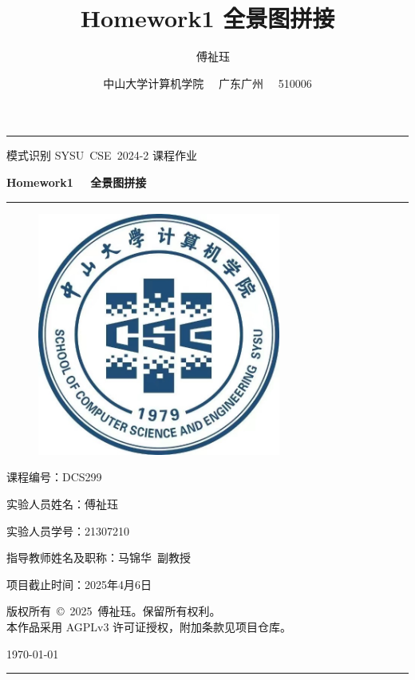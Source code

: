 \documentclass[a4paper, utf8]{ctexart}
\title{\songti \Large \textbf{Homework1 \quad 全景图拼接}}
\author{\fangsong 21307210 \ \  傅祉珏}
\date{\fangsong 中山大学计算机学院 \ \  广东广州 \ \  510006}
\renewcommand*{\songti}{\CJKfamily{zhsong}}
\begin{document}
	\begin{titlepage}
		\centering
		\rule{\textwidth}{1pt}
		\vspace{0.02\textheight}
		
		{\LARGE \kaishu 模式识别 \quad SYSU\ CSE\ 2024-2 \quad 课程作业}
		
		\vspace{0.02\textheight}
		
		{\Huge \songti \bfseries Homework1 \ \  全景图拼接}
		
		\vspace{0.025\textheight}
		\rule{0.83\textwidth}{0.4pt}
		\vspace{0.025\textheight}
		\begin{figure}[htbp]
			\centering
			\includegraphics[width=8cm, height=8cm]{./figure/计院院徽.jpg}
		\end{figure}
		
		\vspace{0.035\textheight} 
		{\Large 课程编号：\textsc{DCS299}}
		
		\vspace{0.025\textheight} 
		{\Large 实验人员姓名：\textsc{傅祉珏}}
		
		\vspace{0.025\textheight} 
		{\Large 实验人员学号：\textsc{21307210}}
		
		\vspace{0.025\textheight} 
		{\Large 指导教师姓名及职称：\textsc{马锦华\ 副教授}}
		
		\vspace{0.025\textheight} 
		{\Large 项目截止时间：\textsc{2025年4月6日}}
		
		\vspace{0.025\textheight} 
		{\small \kaishu 版权所有\ \copyright\ 2025\ 傅祉珏。保留所有权利。\\
		本作品采用 AGPLv3 许可证授权，附加条款见项目仓库。}
		
		\vspace{0.025\textheight} 
		{\large \today}
		\vspace{0.1\textheight}
		\rule{\textwidth}{1pt}
	\end{titlepage}
	\let\cleardoublepage\clearpage
	
\end{document}
